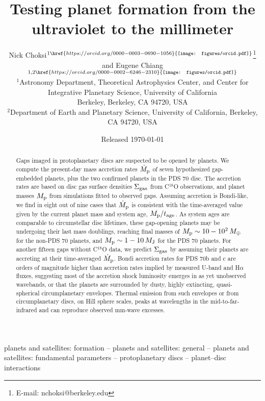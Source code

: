\documentclass[fleqn,usenatbib]{mnras}
\title[Accreting ALMA Protoplanets]{Testing planet formation 
from the ultraviolet to the millimeter}
\author[Choksi \& Chiang]{Nick Choksi$^{1 \href{https://orcid.org/0000-0003-0690-1056}{\texttt{[image: figures/orcid.pdf]}}}$\thanks{E-mail: nchoksi@berkeley.edu} and
Eugene Chiang$^{1,2\href{https://orcid.org/0000-0002-6246-2310}{\texttt{[image: figures/orcid.pdf]}}}$
\\
$^{1}$Astronomy Department, Theoretical Astrophysics Center, and Center for Integrative Planetary Science, University of California\\
\hspace{0.015in} Berkeley, Berkeley, CA 94720, USA\\
$^{2}$Department of Earth and Planetary Science, University of California, Berkeley, CA 94720, USA
}
\date{Released \today}
\newcommand{\Sigg}{\Sigma_{\rm gas}}
\begin{document}
\label{firstpage}
\pagerange{\pageref{firstpage}--\pageref{lastpage}}
\maketitle

\begin{abstract}
Gaps imaged in protoplanetary discs are suspected to be 
opened by planets. We 
compute the present-day mass accretion rates $\dot{M}_{\rm p}$ of seven hypothesized gap-embedded planets, plus the two confirmed planets in the PDS 70 disc. The accretion rates are based on disc gas surface densities $\Sigma_{\rm gas}$ 
from C$^{18}$O observations, and planet masses $M_{\rm p}$ from simulations fitted to observed gaps. Assuming accretion is Bondi-like, we find in eight out of nine cases that $\dot{M}_{\rm p}$
is consistent with the time-averaged value given by the current planet mass and system age, $M_{\rm p}/t_{\rm age}$. As system ages are comparable to circumstellar disc lifetimes, these gap-opening planets 
may be undergoing their last mass doublings, reaching final masses of $M_{\rm p} \sim 10-10^2 \, M_\oplus$ for the non-PDS 70 planets, and $M_{\rm p} \sim 1-10 \, M_{\rm J}$ for the PDS 70 planets. 
For another fifteen gaps without C$^{18}$O data, we predict $\Sigg$ by assuming their planets are accreting at their time-averaged $\dot{M}_{\rm p}$. Bondi accretion rates for PDS 70b and c are orders of magnitude higher than accretion rates implied by measured U-band and H$\alpha$ fluxes, suggesting most of the accretion shock luminosity emerges in as yet unobserved wavebands,
or that the planets are surrounded by dusty, highly extincting, quasi-spherical circumplanetary envelopes. Thermal emission from such envelopes or from circumplanetary discs, on Hill sphere scales, peaks at wavelengths in the mid-to-far-infrared and can reproduce observed mm-wave excesses.
\end{abstract}

\begin{keywords}
planets and satellites: formation -- planets and satellites: general -- planets and satellites: fundamental parameters -- protoplanetary discs -- planet–disc interactions
\end{keywords}

\end{document}
